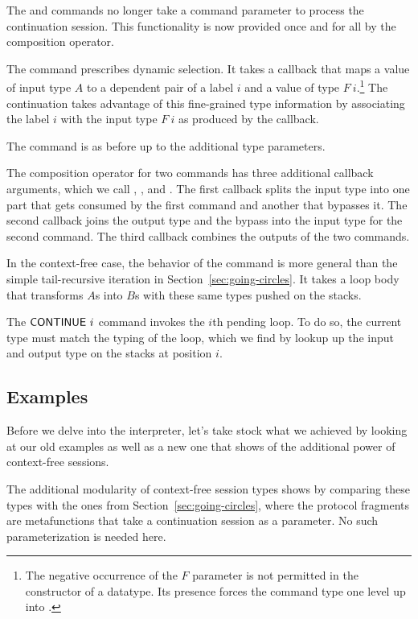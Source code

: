 \documentclass[acmsmall,screen,anonymous,review]{acmart}
\begin{document}
The {\ACSEND} and {\ACRECV} commands no longer take a command parameter
to process the continuation session. This functionality is now
provided once and for all by the composition operator.

The command {\ACSELECT} prescribes dynamic selection. It takes a
callback that maps a value of input type $A$ to a dependent pair of a
label $i$ and a value of type $F~i$.\footnote{The negative occurrence
  of the $F$ parameter is not permitted in the constructor of a
  {\ASet} datatype. Its presence forces the command type one level up
  into {\ASetOne}.} The continuation takes advantage of this
fine-grained type information by associating the label $i$ with the
input type $F~i$ as produced by the callback.

The {\ACCHOICE} command is as before up to the additional type parameters.

The composition operator for two commands has three additional
callback arguments, which we call {\Asplit}, {\Across}, and
{\Ajoin}. The first callback {\Asplit} splits the input type into one part that gets
consumed by the first command and another that bypasses it.
The second callback {\Across} joins the output type and the bypass into the
input type for the second command.
The third callback {\Ajoin} combines the outputs of the two commands.

In the context-free case, the behavior of the {\AMU} command is more
general than the simple tail-recursive iteration in
Section~\ref{sec:going-circles}. It takes a loop body that transforms
$A$s into $B$s with these same types pushed on the stacks.

The {$\ACONTINUE~i$} command invokes the $i$th pending loop. To do so,
the current type must match the typing of the loop, which we find by
lookup up the input and output type on the stacks at position $i$.

\subsection{Examples}
\label{sec:examples}



Before we delve into the interpreter, let's take stock what we
achieved by looking at our old examples as well as a new one that
shows of the additional power of context-free sessions.
\cstBinaryp

The additional modularity of context-free session types shows by
comparing these types with the ones from
Section~\ref{sec:going-circles}, where the protocol fragments are
metafunctions that take a continuation session as a parameter. No such
parameterization is needed here.
\end{document}
